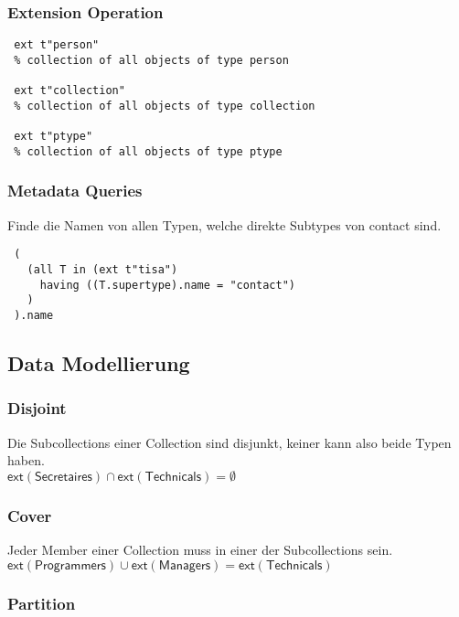 \documentclass[german, 10pt, a4paper, twocolumn]{scrartcl}
\theoremstyle{definition}
\theoremstyle{remark}
\theoremstyle{example}
\begin{document}
\subsubsection{Extension Operation}

\begin{verbatim}
 ext t"person"
 % collection of all objects of type person

 ext t"collection"
 % collection of all objects of type collection

 ext t"ptype"
 % collection of all objects of type ptype
\end{verbatim}

\subsubsection{Metadata Queries}

Finde die Namen von allen Typen, welche direkte Subtypes von contact sind.

\begin{verbatim}
 (
   (all T in (ext t"tisa")
     having ((T.supertype).name = "contact")
   )
 ).name
\end{verbatim}

\subsection{Data Modellierung}

\subsubsection{Disjoint}

Die Subcollections einer Collection sind disjunkt, keiner kann also beide Typen haben.\\

$\mathsf{ext(Secretaires)} \cap \mathsf{ext(Technicals)} = \emptyset$

\subsubsection{Cover}

Jeder Member einer Collection muss in einer der Subcollections sein.\\

$\mathsf{ext(Programmers)} \cup \mathsf{ext(Managers)} = \mathsf{ext(Technicals)}$


\subsubsection{Partition}
\end{document}
